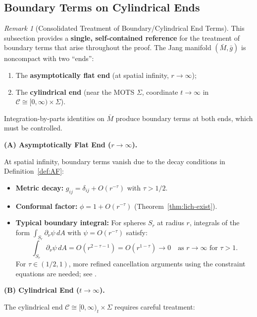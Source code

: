 \documentclass[12pt]{article}
\theoremstyle{plain}
\theoremstyle{definition}
\theoremstyle{remark}
\newtheorem{remark}[theorem]{Remark}
\newcommand{\bg}{\bar{g}}
\newcommand{\bM}{\bar{M}}
\begin{document}
\subsection{Boundary Terms on Cylindrical Ends}\label{subsec:boundary-terms-consolidated}

\begin{remark}[Consolidated Treatment of Boundary/Cylindrical End Terms]
This subsection provides a \textbf{single, self-contained reference} for the treatment of boundary terms that arise throughout the proof. The Jang manifold $(\bM, \bg)$ is noncompact with two ``ends'':
\begin{enumerate}[label=(\roman*)]
    \item The \textbf{asymptotically flat end} (at spatial infinity, $r \to \infty$);
    \item The \textbf{cylindrical end} (near the MOTS $\Sigma$, coordinate $t \to \infty$ in $\mathcal{C} \cong [0,\infty) \times \Sigma$).
\end{enumerate}
Integration-by-parts identities on $\bM$ produce boundary terms at both ends, which must be controlled.
\end{remark}

\textbf{(A) Asymptotically Flat End ($r \to \infty$).}

At spatial infinity, boundary terms vanish due to the decay conditions in Definition~\ref{def:AF}:
\begin{itemize}
    \item \textbf{Metric decay:} $g_{ij} = \delta_{ij} + O(r^{-\tau})$ with $\tau > 1/2$.
    \item \textbf{Conformal factor:} $\phi = 1 + O(r^{-\tau})$ (Theorem~\ref{thm:lich-exist}).
    \item \textbf{Typical boundary integral:} For spheres $S_r$ at radius $r$, integrals of the form $\int_{S_r} \partial_\nu\psi \, dA$ with $\psi = O(r^{-\tau})$ satisfy:
    \[
    \int_{S_r} \partial_\nu\psi \, dA = O(r^{2-\tau-1}) = O(r^{1-\tau}) \to 0 \quad \text{as } r \to \infty \text{ for } \tau > 1.
    \]
    For $\tau \in (1/2, 1)$, more refined cancellation arguments using the constraint equations are needed; see \cite[Proposition 4.1]{bartnik1986}.
\end{itemize}

\textbf{(B) Cylindrical End ($t \to \infty$).}

The cylindrical end $\mathcal{C} \cong [0,\infty)_t \times \Sigma$ requires careful treatment:
\end{document}
